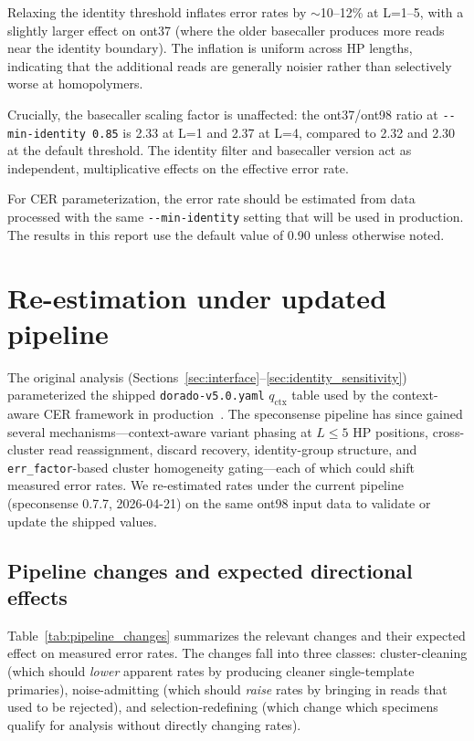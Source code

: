 \documentclass[11pt]{article}
\begin{document}
Relaxing the identity threshold inflates error rates by ${\sim}$10--12\% at
L=1--5, with a slightly larger effect on ont37 (where the older basecaller
produces more reads near the identity boundary). The inflation is uniform
across HP lengths, indicating that the additional reads are generally noisier
rather than selectively worse at homopolymers.

Crucially, the basecaller scaling factor is unaffected: the ont37/ont98 ratio
at \texttt{-{}-min-identity~0.85} is 2.33 at L=1 and 2.37 at L=4, compared to
2.32 and 2.30 at the default threshold. The identity filter and basecaller
version act as independent, multiplicative effects on the effective error rate.

For CER parameterization, the error rate should be estimated from data
processed with the same \texttt{-{}-min-identity} setting that will be used in
production. The results in this report use the default value of 0.90 unless
otherwise noted.


\section{Re-estimation under updated pipeline}
\label{sec:reestimation}

The original analysis (Sections~\ref{sec:interface}--\ref{sec:identity_sensitivity})
parameterized the shipped \texttt{dorado-v5.0.yaml} $q_\text{ctx}$ table used by
the context-aware CER framework in production~\cite{cer_practice}. The
speconsense pipeline has since gained several mechanisms---context-aware
variant phasing at $L \leq 5$ HP positions, cross-cluster read
reassignment, discard recovery, identity-group structure, and
\texttt{err\_factor}-based cluster homogeneity gating---each of which could
shift measured error rates. We re-estimated rates under the current pipeline
(speconsense 0.7.7, 2026-04-21) on the same ont98 input data to validate or
update the shipped values.

\subsection{Pipeline changes and expected directional effects}
\label{sec:pipeline_changes}

Table~\ref{tab:pipeline_changes} summarizes the relevant changes and their
expected effect on measured error rates. The changes fall into three classes:
cluster-cleaning (which should \emph{lower} apparent rates by producing
cleaner single-template primaries), noise-admitting (which should \emph{raise}
rates by bringing in reads that used to be rejected), and selection-redefining
(which change which specimens qualify for analysis without directly changing
rates).
\end{document}
